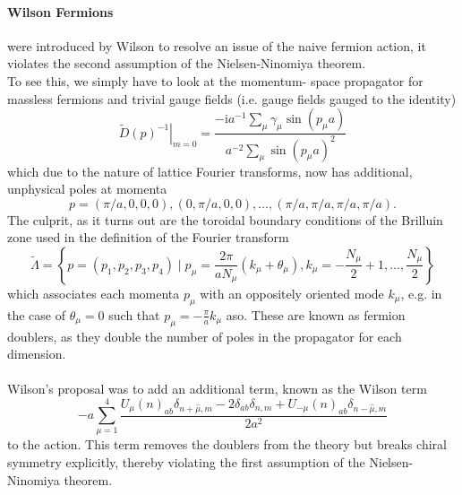 \documentclass[a4paper,10pt]{book}
\begin{document}
\paragraph{Wilson Fermions} were introduced by Wilson to resolve an issue of the naive fermion action, it violates the second assumption of the Nielsen-Ninomiya theorem.\\To see this, we simply have to look at the momentum- space propagator for massless fermions and trivial gauge fields (i.e. gauge fields gauged to the identity)
\begin{equation}
\left.\widetilde{D}(p)^{-1}\right|_{m=0}=\frac{-\mathrm{i} a^{-1} \sum_{\mu} \gamma_{\mu} \sin \left(p_{\mu} a\right)}{a^{-2} \sum_{\mu} \sin \left(p_{\mu} a\right)^{2}}
\end{equation}
which due to the nature of lattice Fourier transforms, now has additional, unphysical poles at momenta 
\begin{equation}
p=(\pi / a, 0,0,0),(0, \pi / a, 0,0), \ldots,(\pi / a, \pi / a, \pi / a, \pi / a).
\end{equation}
The culprit, as it turns out are the toroidal boundary conditions of the Brilluin zone used in the definition of the Fourier transform
\begin{equation}
\widetilde{\Lambda}=\left\{p=\left(p_{1}, p_{2}, p_{3}, p_{4}\right) \mid p_{\mu}=\frac{2 \pi}{a N_{\mu}}\left(k_{\mu}+\theta_{\mu}\right), k_{\mu}=-\frac{N_{\mu}}{2}+1, \ldots, \frac{N_{\mu}}{2}\right\}
\end{equation}
which associates each momenta $p_\mu$ with an oppositely oriented mode $k_\mu$, e.g. in the case of $\theta_\mu = 0$ such that $p_\mu=-\frac{\pi}{a}k_\mu$ aso. These are known as fermion doublers, as they double the number of poles in the propagator for each dimension.\\\\ Wilson's proposal was to add an additional term, known as the Wilson term
\begin{equation}
-a \sum_{\mu=1}^{4} \frac{U_{\mu}(n)_{a b} \delta_{n+\hat{\mu}, m}-2 \delta_{a b} \delta_{n, m}+U_{-\mu}(n)_{a b} \delta_{n-\hat{\mu}, m}}{2 a^{2}}
\end{equation}
to the action. This term removes the doublers from the theory but breaks chiral symmetry explicitly, thereby violating the first assumption of the Nielsen-Ninomiya theorem.
\end{document}
